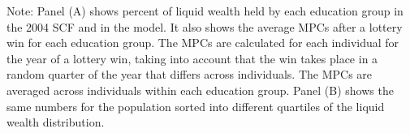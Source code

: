\documentclass[\PathToRoot/\ProjectName]{subfiles}
\begin{document}
\begin{table}[tb]
  \noindent\parbox{\textwidth}{
    \medskip
    \footnotesize Note: Panel (A) shows percent of liquid wealth held by each education group in the 2004 SCF and in the model. It also shows the average MPCs after a lottery win for each education group. The MPCs are calculated for each individual for the year of a lottery win, taking into account that the win takes place in a random quarter of the year that differs across individuals. The MPCs are averaged across individuals within each education group. Panel (B) shows the same numbers for the population sorted into different quartiles of the liquid wealth distribution.
  }
\end{table}

\smartbib
\end{document}
